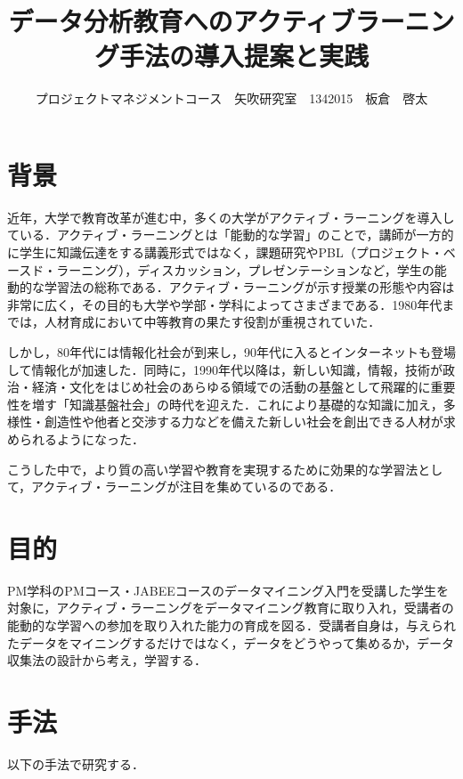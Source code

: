 \documentclass[uplatex,twocolumn,dvipdfmx]{jsarticle}
\title{\vspace{-5mm}\fontsize{14pt}{0pt}\selectfont  データ分析教育へのアクティブラーニング手法の導入提案と実践}
\author{\normalsize プロジェクトマネジメントコース　矢吹研究室　1342015　板倉　啓太}
\date{}
\begin{document}
\fontsize{10.5pt}{\baselineskip}\selectfont
\maketitle




\section{背景}

近年，大学で教育改革が進む中，多くの大学がアクティブ・ラーニングを導入している．アクティブ・ラーニングとは「能動的な学習」のことで，講師が一方的に学生に知識伝達をする講義形式ではなく，課題研究やPBL（プロジェクト・ベースド・ラーニング），ディスカッション，プレゼンテーションなど，学生の能動的な学習法の総称である．アクティブ・ラーニングが示す授業の形態や内容は非常に広く，その目的も大学や学部・学科によってさまざまである．1980年代までは，人材育成において中等教育の果たす役割が重視されていた．

しかし，80年代には情報化社会が到来し，90年代に入るとインターネットも登場して情報化が加速した\cite{a}．同時に，1990年代以降は，新しい知識，情報，技術が政治・経済・文化をはじめ社会のあらゆる領域での活動の基盤として飛躍的に重要性を増す「知識基盤社会」の時代を迎えた．これにより基礎的な知識に加え，多様性・創造性や他者と交渉する力などを備えた新しい社会を創出できる人材が求められるようになった．

こうした中で，より質の高い学習や教育を実現するために効果的な学習法として，アクティブ・ラーニングが注目を集めているのである．




\section{目的}

PM学科のPMコース・JABEEコースのデータマイニング入門を受講した学生を対象に，アクティブ・ラーニングをデータマイニング教育に取り入れ，受講者の能動的な学習への参加を取り入れた能力の育成を図る．受講者自身は，与えられたデータをマイニングするだけではなく，データをどうやって集めるか，データ収集法の設計から考え，学習する\cite{b}．



\section{手法}

以下の手法で研究する．
\end{document}
